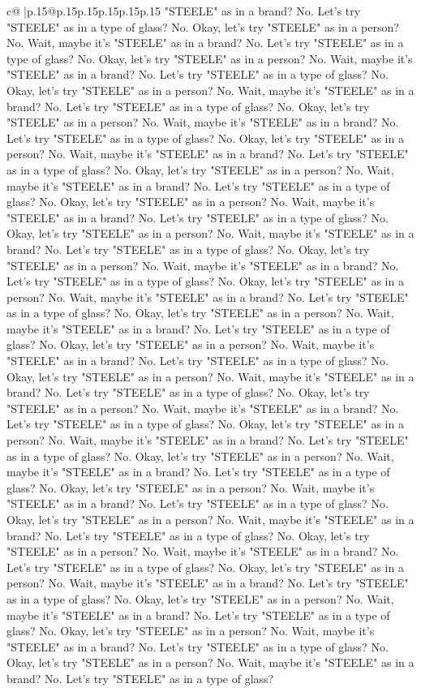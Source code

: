 \documentclass{article}
\begin{document}
{\begin{supertabular}{c@{$\;$}|p{.15\linewidth}@{}p{.15\linewidth}p{.15\linewidth}p{.15\linewidth}p{.15\linewidth}p{.15\linewidth}}
{{{"STEELE" as in a brand? No. Let's try "STEELE" as in a type of glass? No. Okay, let's try "STEELE" as in a person? No. Wait, maybe it's "STEELE" as in a brand? No. Let's try "STEELE" as in a type of glass? No. Okay, let's try "STEELE" as in a person? No. Wait, maybe it's "STEELE" as in a brand? No. Let's try "STEELE" as in a type of glass? No. Okay, let's try "STEELE" as in a person? No. Wait, maybe it's "STEELE" as in a brand? No. Let's try "STEELE" as in a type of glass? No. Okay, let's try "STEELE" as in a person? No. Wait, maybe it's "STEELE" as in a brand? No. Let's try "STEELE" as in a type of glass? No. Okay, let's try "STEELE" as in a person? No. Wait, maybe it's "STEELE" as in a brand? No. Let's try "STEELE" as in a type of glass? No. Okay, let's try "STEELE" as in a person? No. Wait, maybe it's "STEELE" as in a brand? No. Let's try "STEELE" as in a type of glass? No. Okay, let's try "STEELE" as in a person? No. Wait, maybe it's "STEELE" as in a brand? No. Let's try "STEELE" as in a type of glass? No. Okay, let's try "STEELE" as in a person? No. Wait, maybe it's "STEELE" as in a brand? No. Let's try "STEELE" as in a type of glass? No. Okay, let's try "STEELE" as in a person? No. Wait, maybe it's "STEELE" as in a brand? No. Let's try "STEELE" as in a type of glass? No. Okay, let's try "STEELE" as in a person? No. Wait, maybe it's "STEELE" as in a brand? No. Let's try "STEELE" as in a type of glass? No. Okay, let's try "STEELE" as in a person? No. Wait, maybe it's "STEELE" as in a brand? No. Let's try "STEELE" as in a type of glass? No. Okay, let's try "STEELE" as in a person? No. Wait, maybe it's "STEELE" as in a brand? No. Let's try "STEELE" as in a type of glass? No. Okay, let's try "STEELE" as in a person? No. Wait, maybe it's "STEELE" as in a brand? No. Let's try "STEELE" as in a type of glass? No. Okay, let's try "STEELE" as in a person? No. Wait, maybe it's "STEELE" as in a brand? No. Let's try "STEELE" as in a type of glass? No. Okay, let's try "STEELE" as in a person? No. Wait, maybe it's "STEELE" as in a brand? No. Let's try "STEELE" as in a type of glass? No. Okay, let's try "STEELE" as in a person? No. Wait, maybe it's "STEELE" as in a brand? No. Let's try "STEELE" as in a type of glass? No. Okay, let's try "STEELE" as in a person? No. Wait, maybe it's "STEELE" as in a brand? No. Let's try "STEELE" as in a type of glass? No. Okay, let's try "STEELE" as in a person? No. Wait, maybe it's "STEELE" as in a brand? No. Let's try "STEELE" as in a type of glass? No. Okay, let's try "STEELE" as in a person? No. Wait, maybe it's "STEELE" as in a brand? No. Let's try "STEELE" as in a type of glass? No. Okay, let's try "STEELE" as in a person? No. Wait, maybe it's "STEELE" as in a brand? No. Let's try "STEELE" as in a type of glass? No. Okay, let's try "STEELE" as in a person? No. Wait, maybe it's "STEELE" as in a brand? No. Let's try "STEELE" as in a type of glass? No. Okay, let's try "STEELE" as in a person? No. Wait, maybe it's "STEELE" as in a brand? No. Let's try "STEELE" as in a type of glass? No. Okay, let's try "STEELE" as in a person? No. Wait, maybe it's "STEELE" as in a brand? No. Let's try "STEELE" as in a type of glass? }}}
\end{supertabular}}
\end{document}

